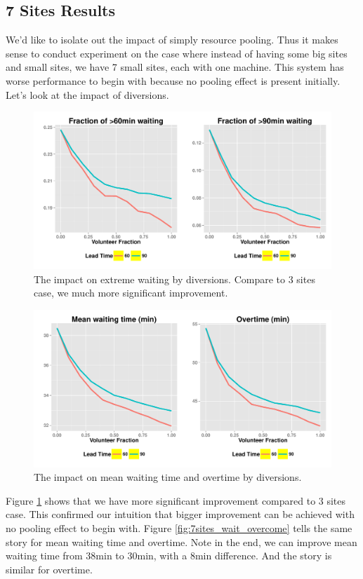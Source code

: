 \subsection{7 Sites Results}

We'd like to isolate out the impact of simply resource pooling. Thus
it makes sense to conduct experiment on the case where instead of
having some big sites and small sites, we have 7 small sites, each
with one machine. This system has worse performance to begin with
because no pooling effect is present initially. Let's look at the
impact of diversions.

\begin{figure}[htp]
\centering
\includegraphics[width=.9\textwidth]{chap3/numeric/pic/7sites_extreme}
\caption{The impact on extreme waiting by diversions. Compare to
3 sites case, we much more significant improvement.}
\label{fig:7sites_extreme}
\end{figure}

\begin{figure}[htp]
\centering
\includegraphics[width=.9\textwidth]{chap3/numeric/pic/7sites_wait_overtime}
\caption{The impact on mean waiting time and overtime by diversions.}
\label{fig:7sites_wait_overtime}
\end{figure}

Figure \ref{fig:7sites_extreme} shows that we have more significant
improvement compared to 3 sites case. This confirmed our intuition
that bigger improvement can be achieved with no pooling effect to begin with.
Figure \ref{fig:7sites_wait_overcome} tells the same story for mean
waiting time and overtime. Note in the end, we can improve mean waiting
time from 38min to 30min, with a 8min difference. And the story is
similar for overtime.

